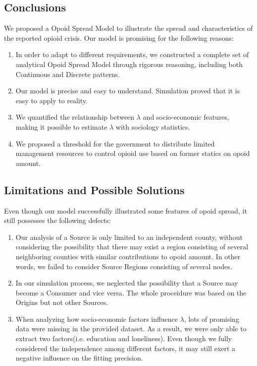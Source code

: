 \subsection{Conclusions}
We proposed a Opoid Spread Model to illustrate the spread and characteristics of the reported opioid crisis. Our model is promising for the following reasons:
\begin{enumerate}
	\item In order to adapt to different requirements, we constructed a complete set of analytical Opoid Spread Model through rigorous reasoning, including both Continuous and Discrete patterns. 
	
	\item Our model is precise and easy to understand. Simulation proved that it is easy to apply to reality.
	
	\item We quantified the relationship between $\lambda$ and socio-economic features, making it possible to estimate $\lambda$ with sociology statistics.
	
	\item We proposed a threshold for the government to distribute limited management resources to control opioid use based on former statics on opoid amount.
\end{enumerate}

\subsection{Limitations and Possible Solutions}
Even though our model successfully illustrated some features of opoid spread, it still possesses the following defects:
\begin{enumerate}
	\item Our analysis of a Source is only limited to an independent county, without considering the possibility that there may exist a region consisting of several neighboring counties with similar contributions to opoid amount. In other words, we failed to consider Source Regions consisting of several nodes.
	
	\item  In our simulation process, we neglected the possibility that a Source may become a Consumer and vice versa. The whole proceidure was based on the Origins but not other Sources.
	
	\item  When analyzing how socio-economic factors influence $\lambda$, lots of promising data were missing in the provided dataset. As a result, we were only able to extract two factors(i.e. education and loneliness). Even though we fully considered the independence among different factors, it may still exert a negative influence on the fitting precision. 
\end{enumerate}



